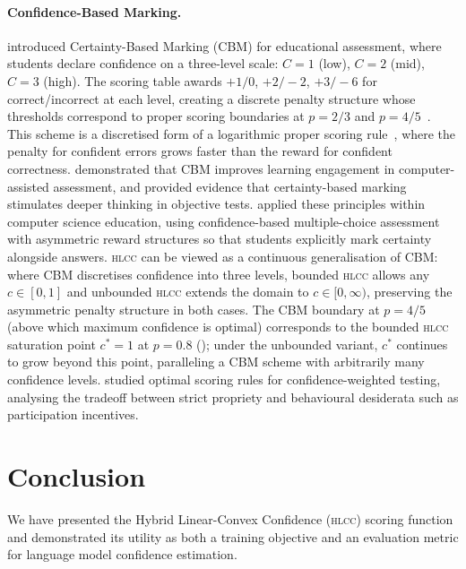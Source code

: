 \documentclass[11pt,a4paper]{article}
\newcommand{\hlcc}{\textsc{hlcc}}
\newcommand{\cstar}{c^{*}}
\begin{document}
\paragraph{Confidence-Based Marking.}
\citet{gardnermedwin1995} introduced Certainty-Based Marking (CBM) for
educational assessment, where students declare confidence on a
three-level scale: $C{=}1$ (low), $C{=}2$ (mid), $C{=}3$ (high).
The scoring table awards $+1/0$, $+2/{-}2$, $+3/{-}6$ for
correct/incorrect at each level, creating a discrete penalty structure
whose thresholds correspond to proper scoring boundaries at $p = 2/3$
and $p = 4/5$~\cite{gardnermedwin2006}.  This scheme is a discretised
form of a logarithmic proper scoring rule~\cite{good1952,dawid1986},
where the penalty for confident errors grows faster than the reward for
confident correctness.  \citet{gardnermedwin2003} demonstrated that CBM
improves learning engagement in computer-assisted assessment, and
\citet{gardnermedwin2019} provided evidence that certainty-based marking
stimulates deeper thinking in objective tests.
\citet{mccallum2010gamedesign} applied these principles within
computer science education, using confidence-based multiple-choice
assessment with asymmetric reward structures so that students
explicitly mark certainty alongside answers.
\hlcc{} can be viewed as a continuous generalisation of CBM: where CBM
discretises confidence into three levels, bounded \hlcc{} allows any
$c \in [0,1]$ and unbounded \hlcc{} extends the domain to
$c \in [0, \infty)$, preserving the asymmetric penalty structure
in both cases.  The CBM boundary at
$p = 4/5$ (above which maximum confidence is optimal) corresponds to
the bounded \hlcc{} saturation point $\cstar = 1$ at $p = 0.8$
(); under the unbounded variant, $\cstar$ continues
to grow beyond this point, paralleling a CBM scheme with arbitrarily
many confidence levels.  \citet{budescu2012optimal} studied optimal
scoring rules for confidence-weighted testing, analysing the tradeoff
between strict propriety and behavioural desiderata such as participation
incentives.


\section{Conclusion}
\label{sec:conclusion}

We have presented the Hybrid Linear-Convex Confidence (\hlcc{}) scoring
function and demonstrated its utility as both a training objective and
an evaluation metric for language model confidence estimation.
\end{document}
